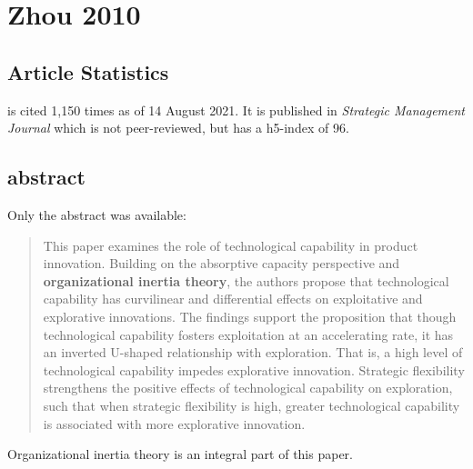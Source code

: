 \section{Zhou 2010}

\subsection{Article Statistics}

\cite{zhou2010technological} is cited 1,150 times as of 14 August 2021. It is published in \textit{Strategic Management Journal} which is not peer-reviewed, but has a h5-index of 96.

\subsection{abstract}

Only the abstract was available:

\begin{quotation}
	This paper examines the role of technological capability in product innovation. Building on the absorptive capacity perspective and \textbf{organizational inertia theory}, the authors propose that technological capability has curvilinear and differential effects on exploitative and explorative innovations. The findings support the proposition that though technological capability fosters exploitation at an accelerating rate, it has an inverted U-shaped relationship with exploration. That is, a high level of technological capability impedes explorative innovation. Strategic flexibility strengthens the positive effects of technological capability on exploration, such that when strategic flexibility is high, greater technological capability is associated with more explorative innovation.
\end{quotation}

Organizational inertia theory is an integral part of this paper.

